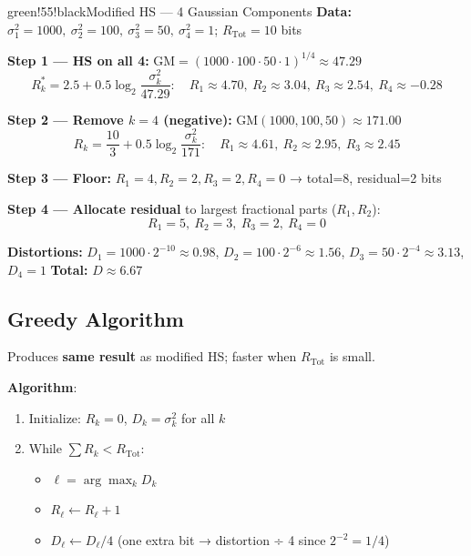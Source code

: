 \begin{calloutbox}{green!55!black}{Modified HS — 4 Gaussian Components}
\textbf{Data:} $\sigma_1^2=1000,\ \sigma_2^2=100,\ \sigma_3^2=50,\ \sigma_4^2=1$; $R_{\text{Tot}}=10$ bits

\textbf{Step 1 — HS on all 4:} GM$= (1000\cdot100\cdot50\cdot1)^{1/4}\approx47.29$
\[
R_k^* = 2.5 + 0.5\log_2\frac{\sigma_k^2}{47.29}: \quad R_1\approx4.70,\ R_2\approx3.04,\ R_3\approx2.54,\ R_4\approx-0.28
\]

\textbf{Step 2 — Remove $k=4$ (negative):} GM$(1000,100,50)\approx171.00$
\[
R_k = \frac{10}{3}+0.5\log_2\frac{\sigma_k^2}{171}: \quad R_1\approx4.61,\ R_2\approx2.95,\ R_3\approx2.45
\]

\textbf{Step 3 — Floor:} $R_1=4, R_2=2, R_3=2, R_4=0$ → total=8, residual=2 bits

\textbf{Step 4 — Allocate residual} to largest fractional parts ($R_1,R_2$):
\[
R_1=5,\ R_2=3,\ R_3=2,\ R_4=0
\]

\textbf{Distortions:} $D_1=1000\cdot2^{-10}\approx0.98$, $D_2=100\cdot2^{-6}\approx1.56$, $D_3=50\cdot2^{-4}\approx3.13$, $D_4=1$ \textbf{Total:} $D\approx6.67$
\end{calloutbox}

\subsection{Greedy Algorithm}

Produces \textbf{same result} as modified HS; faster when $R_{\text{Tot}}$ is small.

\textbf{Algorithm}:
\begin{enumerate}
\item Initialize: $R_k = 0$, $D_k = \sigma_k^2$ for all $k$
\item While $\sum R_k < R_{\text{Tot}}$:
\begin{itemize}
\item $\ell = \arg\max_k D_k$
\item $R_\ell \leftarrow R_\ell + 1$
\item $D_\ell \leftarrow D_\ell / 4$ (one extra bit → distortion ÷ 4 since $2^{-2} = 1/4$)
\end{itemize}
\end{enumerate}

